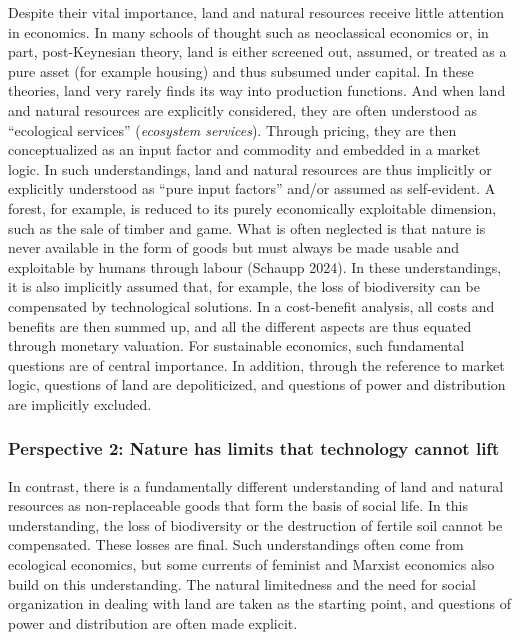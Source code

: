 \documentclass[
  british,
  a4paper,
  DIV=11,
  numbers=noendperiod,
  oneside,
  openany]{scrreprt}
\begin{document}
Despite their vital importance, land and natural resources receive
little attention in economics. In many schools of thought such as
neoclassical economics or, in part, post-Keynesian theory, land is
either screened out, assumed, or treated as a pure asset (for example
housing) and thus subsumed under capital. In these theories, land very
rarely finds its way into production functions. And when land and
natural resources are explicitly considered, they are often understood
as ``ecological services'' (\emph{ecosystem services}). Through pricing,
they are then conceptualized as an input factor and commodity and
embedded in a market logic. In such understandings, land and natural
resources are thus implicitly or explicitly understood as ``pure input
factors'' and/or assumed as self-evident. A forest, for example, is
reduced to its purely economically exploitable dimension, such as the
sale of timber and game. What is often neglected is that nature is never
available in the form of goods but must always be made usable and
exploitable by humans through labour (Schaupp 2024). In these
understandings, it is also implicitly assumed that, for example, the
loss of biodiversity can be compensated by technological solutions. In a
cost-benefit analysis, all costs and benefits are then summed up, and
all the different aspects are thus equated through monetary valuation.
For sustainable economics, such fundamental questions are of central
importance. In addition, through the reference to market logic,
questions of land are depoliticized, and questions of power and
distribution are implicitly excluded.

\subsubsection{Perspective 2: Nature has limits that technology cannot
lift}\label{perspective-2-nature-has-limits-that-technology-cannot-lift}

In contrast, there is a fundamentally different understanding of land
and natural resources as non-replaceable goods that form the basis of
social life. In this understanding, the loss of biodiversity or the
destruction of fertile soil cannot be compensated. These losses are
final. Such understandings often come from ecological economics, but
some currents of feminist and Marxist economics also build on this
understanding. The natural limitedness and the need for social
organization in dealing with land are taken as the starting point, and
questions of power and distribution are often made explicit.
\end{document}
